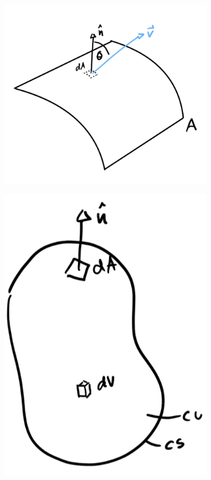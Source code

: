 \begin{figure}[H]
	\centering
	\begin{subfigure}[b]{0.5\linewidth}
		\centering
		\includegraphics[width=\linewidth]{Sketches/RTTSystemArea}
		\caption{}
		\label{fig:rttsystemarea}
	\end{subfigure}
	\hfill
	\begin{subfigure}[b]{0.3\linewidth}
		\centering
		\includegraphics[width=\linewidth]{Sketches/RTTSystemVolume}

\end{subfigure}
\end{figure}
